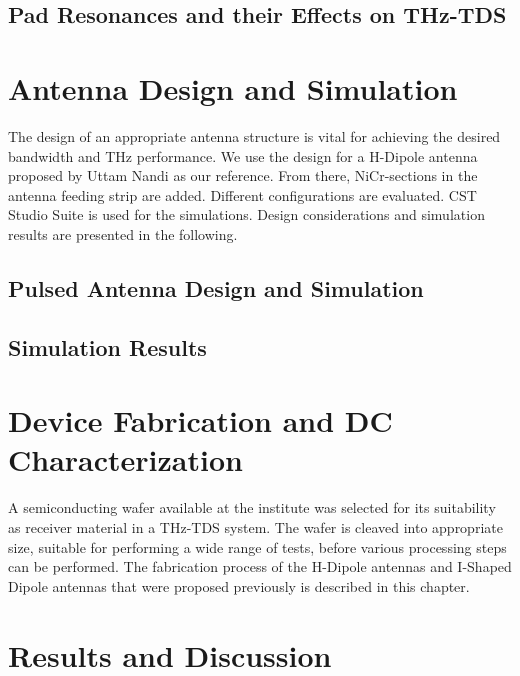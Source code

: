 \documentclass[
	german,%
	accentcolor=9c,%
	ruledheaders=section,%
	class=report,%
	thesis={type=bachelor},%
	fontsize=11pt,%
	parskip=half-,%
	custommargins=false,%
	marginpar=false,%
	BCOR = 0mm,%
 	logofile=tools/logo-installation/TUDa-logos/tuda_logo.png,%
]{tudapub}
\begin{document}
\section{Pad Resonances and their Effects on THz-TDS}
\label{sec:padResonances}


\chapter{Antenna Design and Simulation}

The design of an appropriate antenna structure is vital for achieving the desired bandwidth and THz performance. We use the design for a H-Dipole antenna proposed by Uttam Nandi \cite{nandiErAsInAlGaAsPhotoconductors2021} as our reference. From there, NiCr-sections in the antenna feeding strip are added. Different configurations are evaluated. CST Studio Suite is used for the simulations. Design considerations and simulation results are presented in the following.

\section{Pulsed Antenna Design and Simulation}


\section{Simulation Results}

\label{sec:sim_results}



\chapter{Device Fabrication and DC Characterization}
A semiconducting wafer available at the institute was selected for its suitability as receiver material in a THz-TDS system. The wafer is cleaved into appropriate size, suitable for performing a wide range of tests, before various processing steps can be performed. The fabrication process of the H-Dipole antennas and I-Shaped Dipole antennas that were proposed previously is described in this chapter.



\chapter{Results and Discussion}
\end{document}
